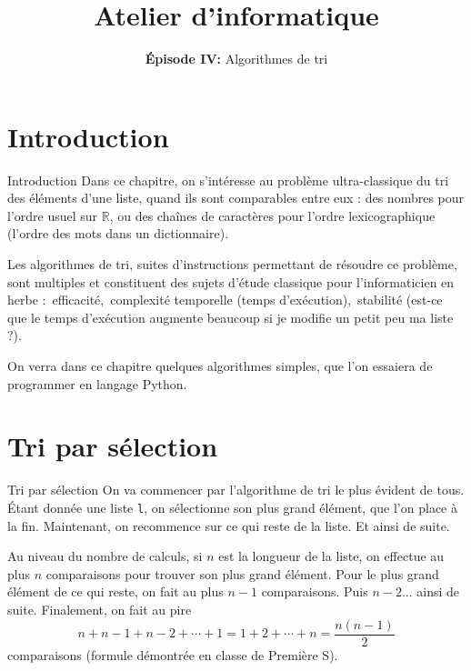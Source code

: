 \documentclass[10pt,xcolor={dvipsnames}]{beamer}
\title{Atelier d'informatique}
\subtitle{\textbf{Épisode IV:} Algorithmes de tri}
\newcommand{\R}{\mathbb R}
\begin{document}
\begin{frame}
	\titlepage
\end{frame}

\frame{\tableofcontents}

\section{Introduction}

\begin{frame}{Introduction}
	Dans ce chapitre, on s'intéresse au problème ultra-classique du tri des éléments d'une liste, quand ils sont comparables entre eux : des nombres pour l'ordre usuel sur $\R$, ou des chaînes de caractères pour l'ordre lexicographique (l'ordre des mots dans un dictionnaire).
	\pause
	
	Les algorithmes de tri, suites d'instructions permettant de résoudre ce problème, sont multiples et constituent des sujets d'étude classique pour l'informaticien en herbe :\pause\, efficacité,\pause\, complexité temporelle (temps d'exécution),\pause\, stabilité (est-ce que le temps d'exécution augmente beaucoup si je modifie un petit peu ma liste ?).
	\pause
	
	On verra dans ce chapitre quelques algorithmes simples, que l'on essaiera de programmer en langage Python.
\end{frame}

\section{Tri par sélection}

\begin{frame}{Tri par sélection}
	On va commencer par l'algorithme de tri le plus évident de tous. Étant donnée une liste \lstinline|l|, on sélectionne son plus grand élément, que l'on place à la fin. Maintenant, on recommence sur ce qui reste de la liste. Et ainsi de suite.
	\pause
	
	Au niveau du nombre de calculs, si $n$ est la longueur de la liste, on effectue au plus $n$ comparaisons pour trouver son plus grand élément. Pour le plus grand élément de ce qui reste, on fait au plus $n-1$ comparaisons. Puis $n-2$... ainsi de suite. Finalement, on fait au pire
	\begin{equation*}
	n + n-1 + n-2 + \cdots + 1 = 1 + 2 + \cdots + n = \frac{n(n-1)}{2}
	\end{equation*}
	comparaisons (formule démontrée en classe de Première S).	
\end{frame}
\end{document}
